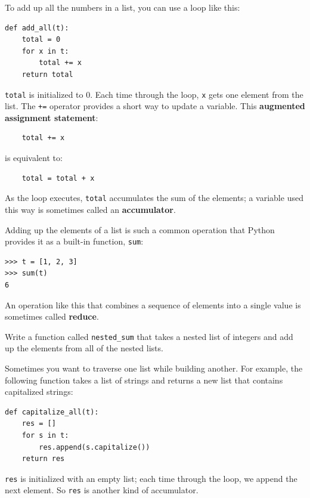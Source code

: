 \documentclass[10pt]{book}
\begin{document}
To add up all the numbers in a list, you can use a loop like this:


\begin{verbatim}
def add_all(t):
    total = 0
    for x in t:
        total += x
    return total
\end{verbatim}
%
{\tt total} is initialized to 0.  Each time through the loop,
{\tt x} gets one element from the list.  The {\tt +=} operator
provides a short way to update a variable.  This 
{\bf augmented assignment statement}:

\begin{verbatim}
    total += x
\end{verbatim}
%
is equivalent to:

\begin{verbatim}
    total = total + x
\end{verbatim}
%
As the loop executes, {\tt total} accumulates the sum of the
elements; a variable used this way is sometimes called an
{\bf accumulator}.

Adding up the elements of a list is such a common operation
that Python provides it as a built-in function, {\tt sum}:

\begin{verbatim}
>>> t = [1, 2, 3]
>>> sum(t)
6
\end{verbatim}
%
An operation like this that combines a sequence of elements into
a single value is sometimes called {\bf reduce}.

\begin{exercise}

Write a function called \verb"nested_sum" that takes a nested list
of integers and add up the elements from all of the nested lists.

\end{exercise}

Sometimes you want to traverse one list while building
another.  For example, the following function takes a list of strings
and returns a new list that contains capitalized strings:

\begin{verbatim}
def capitalize_all(t):
    res = []
    for s in t:
        res.append(s.capitalize())
    return res
\end{verbatim}
%
{\tt res} is initialized with an empty list; each time through
the loop, we append the next element.  So {\tt res} is another
kind of accumulator.
\end{document}

